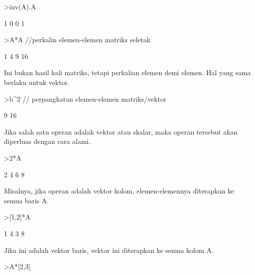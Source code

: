 \documentclass[a4paper,10pt]{article}
\begin{document}
\begin{eulernotebook}
\begin{eulerprompt}
>inv(A).A
\end{eulerprompt}
\begin{euleroutput}
              1             0 
              0             1 
\end{euleroutput}
\begin{eulerprompt}
>A*A //perkalin elemen-elemen matriks seletak
\end{eulerprompt}
\begin{euleroutput}
              1             4 
              9            16 
\end{euleroutput}
\begin{eulercomment}
Ini bukan hasil kali matriks, tetapi perkalian elemen demi elemen. Hal
yang sama berlaku untuk vektor.
\end{eulercomment}
\begin{eulerprompt}
>b^2 // perpangkatan elemen-elemen matriks/vektor
\end{eulerprompt}
\begin{euleroutput}
              9 
             16 
\end{euleroutput}
\begin{eulercomment}
Jika salah satu operan adalah vektor atau skalar, maka operan tersebut
akan diperluas dengan cara alami.
\end{eulercomment}
\begin{eulerprompt}
>2*A
\end{eulerprompt}
\begin{euleroutput}
              2             4 
              6             8 
\end{euleroutput}
\begin{eulercomment}
Misalnya, jika operan adalah vektor kolom, elemen-elemennya diterapkan
ke semua baris A.
\end{eulercomment}
\begin{eulerprompt}
>[1,2]*A
\end{eulerprompt}
\begin{euleroutput}
              1             4 
              3             8 
\end{euleroutput}
\begin{eulercomment}
Jika ini adalah vektor baris, vektor ini diterapkan ke semua kolom A.
\end{eulercomment}
\begin{eulerprompt}
>A*[2,3]
\end{eulerprompt}
\begin{euleroutput}

\end{euleroutput}
\end{eulernotebook}
\end{document}
